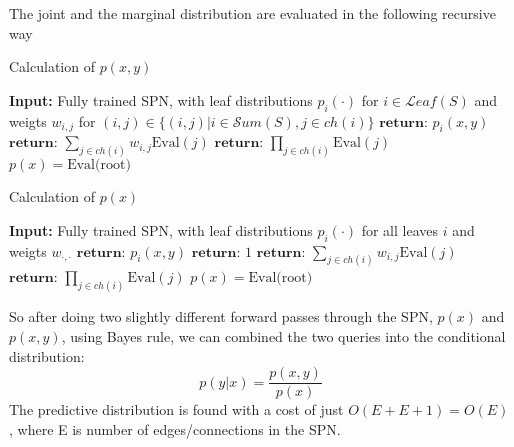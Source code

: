 The joint and the marginal distribution are evaluated in the following recursive way
\begin{algorithm}
    \caption*{Calculation of $p(x,y)$}\label{SPN_1}
    \begin{algorithmic}
    \State \textbf{Input:} Fully trained SPN, with leaf distributions $p_i(\cdot)$ for $i\in \mathcal{L}eaf(S)$ and weigts 
    $w_{i,j}$ for $(i,j) \in \{(i,j)|i \in \mathcal{S}um(S), j \in ch(i)\}$ 
        \State  $\textbf{return: } p_i(x,y)$ 
    \EndIf
        \State $\textbf{return: } \sum_{j\in ch(i)} w_{i,j} \text{Eval}(j)$
    \EndIf
        \State $\textbf{return: } \prod_{j \in ch(i)} \text{Eval}(j)$
    \EndIf
    \EndFunction
    \State $p(x) =  \text{Eval(root)}$
    \end{algorithmic}
\end{algorithm}

\begin{algorithm}[H]
    \caption*{Calculation of $p(x)$}\label{SPN}
    \begin{algorithmic}
    \State \textbf{Input:} Fully trained SPN, with leaf distributions $p_i(\cdot)$ for all leaves $i$ and weigts $w_{\cdot,\cdot}$ 
            \State  $\textbf{return: } p_i(x,y)$ 
        \Else 
            \State  $\textbf{return: } 1$ 
        \EndIf
    \EndIf
        \State $\textbf{return: } \sum_{j\in ch(i)} w_{i,j} \text{Eval}(j)$
    \EndIf
        \State $\textbf{return: } \prod_{j \in ch(i)} \text{Eval}(j)$
    \EndIf
    \EndFunction
    \State $p(x) =  \text{Eval(root)}$
    \end{algorithmic}
\end{algorithm}

So after doing two slightly different forward passes through the SPN, 
$p(x)$ and $p(x,y)$, using Bayes rule,
we can combined the two queries into the conditional distribution: 
$$p(y|x) = \frac{p(x,y)}{p(x)}$$
The predictive distribution is found with a cost of just $O(E+E+1) = O(E)$, where E is number
of edges/connections in the SPN. 

